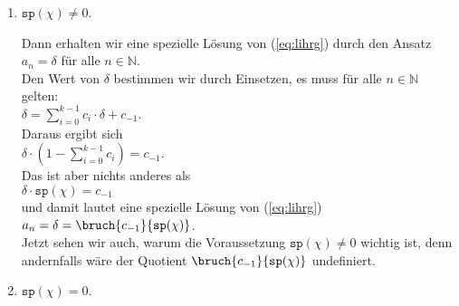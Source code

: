 \begin{enumerate}
\item $\mathtt{sp}(\chi) \not= 0$.

      Dann erhalten wir eine spezielle L\"{o}sung von (\ref{eq:lihrg}) durch den Ansatz \\[0.2cm]
      \hspace*{1.3cm} $a_n = \delta$ \quad f\"{u}r alle $n \in \mathbb{N}$. \\[0.2cm]
      Den Wert von $\delta$ bestimmen wir durch Einsetzen, es muss f\"{u}r alle $n\in \mathbb{N}$ gelten: \\[0.2cm]
      \hspace*{1.3cm} 
      $\delta = \sum\limits_{i=0}^{k-1} c_{i} \cdot \delta + c_{-1}$.
      \\[0.2cm]
      Daraus ergibt sich \\[0.2cm]
      \hspace*{1.3cm} 
      $\delta \cdot \left(1 - \sum\limits_{i=0}^{k-1} c_{i} \right) =  c_{-1}$. \\[0.2cm]
      Das ist aber nichts anderes als \\[0.2cm]
      \hspace*{1.3cm} $\delta \cdot \mathtt{sp}(\chi) = c_{-1}$ \\[0.2cm]
      und damit lautet eine spezielle L\"{o}sung von (\ref{eq:lihrg}) \\[0.2cm]
      \hspace*{1.3cm} $a_n = \delta = \bruch{c_{-1}}{\mathtt{sp}(\chi)}$.
      \\[0.2cm]
      Jetzt sehen wir auch, warum die Voraussetzung $\mathtt{sp}(\chi) \not= 0$
      wichtig ist, denn andernfalls w\"{a}re der Quotient
      $\bruch{c_{-1}}{\mathtt{sp}(\chi)}$ undefiniert.
\item $\mathtt{sp}(\chi) = 0$.


\end{enumerate}

